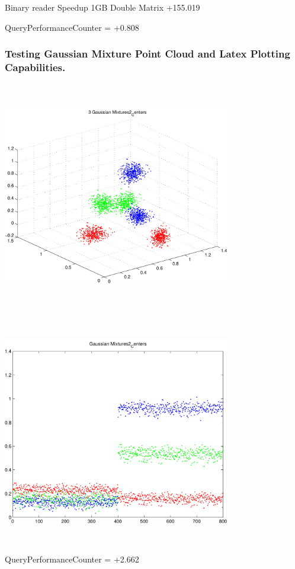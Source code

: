 \documentclass[9pt]{article}
\theoremstyle{plain}
\theoremstyle{definition}
\theoremstyle{remark}
\numberwithin{equation}{section}
\begin{document}
Binary reader Speedup 1GB Double Matrix +155.019

QueryPerformanceCounter  =  +0.808
\subsubsection{Testing Gaussian Mixture Point Cloud and Latex Plotting Capabilities.}
\includegraphics[width=10.0cm,height=10.0cm]{GaussianMixture_Dim_3_Centers2.pdf}

\includegraphics[width=10.0cm,height=10.0cm]{GaussianMixture_Dim_1_Centers2.pdf}

QueryPerformanceCounter  =  +2.662
\end{document}

